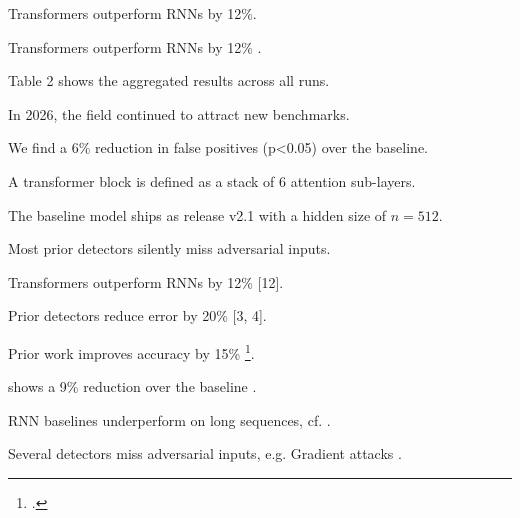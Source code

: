 \documentclass{article}
\begin{document}
Transformers outperform RNNs by 12\%.

Transformers outperform RNNs by 12\% \cite{vaswani2017}.

Table 2 shows the aggregated results across all runs.

In 2026, the field continued to attract new benchmarks.

We find a 6\% reduction in false positives (p<0.05) over the baseline.

A transformer block is defined as a stack of 6 attention sub-layers.

The baseline model ships as release v2.1 with a hidden size of $n = 512$.

Most prior detectors silently miss adversarial inputs.


Transformers outperform RNNs by 12\% [12].

Prior detectors reduce error by 20\% [3, 4].

Prior work improves accuracy by 15\% \footcite{smith2020}.

\citeauthor{jones2019} shows a 9\% reduction over the baseline \parencite{jones2019}.

RNN baselines underperform on long sequences, cf. \cite{vaswani2017}.

Several detectors miss adversarial inputs, e.g. Gradient attacks \cite{goodfellow2015}.
\end{document}
